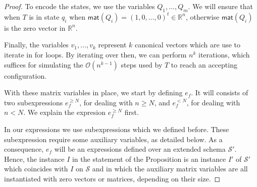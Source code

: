 \begin{proof}
To encode the states, we use the variables $Q_1,\ldots,Q_m$. We will ensure that when $T$ is in state 
$q_i$ when
 $\mathsf{mat}(Q_i)=(1,0,\ldots,0)^t\in\mathbb{R}^n$, otherwise $\mathsf{mat}(Q_i)$ is the zero 
 vector in $\mathbb{R}^n$.	

Finally, the variables $v_1,\ldots,v_{k}$ represent $k$ canonical vectors  which are use to iterate 
in for loops. By iterating over then, we can perform $n^{k}$ iterations, 
which suffices for simulating the $\mathcal{O}(n^{k-1})$ steps used by $T$ to reach an accepting configuration. 

With these matrix variables in place, we start by defining $e_f$. It will consists of two subexpressions
$e_f^{\geq N}$, for dealing with $n\geq N$, and $e_f^{<N}$, for dealing with $n<N$. We explain the expresion
$e_f^{\geq N}$ first.



In our  expressions we use subexpressions which we defined before. These subexpression 
require some auxiliary variables, as detailed below. As a consequence, $e_f$ will be an expressions 
defined over an extended schema $\mathcal{S}'$. Hence, the instance $I$ in the statement of the Proposition 
is  an instance $I'$ of $\mathcal{S}'$ which
coincides with $I$ on $\mathcal{S}$ and in which the auxiliary matrix variables are all instantiated with 
zero vectors or matrices, depending on their size.


\end{proof}
